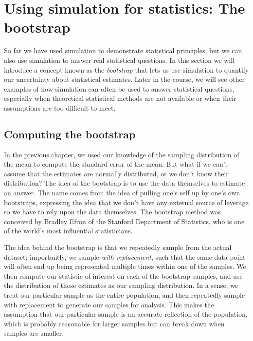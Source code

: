 \documentclass[12pt,]{book}
\theoremstyle{definition}
\theoremstyle{definition}
\theoremstyle{definition}
\theoremstyle{remark}
\begin{document}
\hypertarget{using-simulation-for-statistics-the-bootstrap}{%
\section{Using simulation for statistics: The bootstrap}\label{using-simulation-for-statistics-the-bootstrap}}

So far we have used simulation to demonstrate statistical principles, but we can also use simulation to answer real statistical questions. In this section we will introduce a concept known as the \emph{bootstrap} that lets us use simulation to quantify our uncertainty about statistical estimates. Later in the course, we will see other examples of how simulation can often be used to answer statistical questions, especially when theoretical statistical methods are not available or when their assumptions are too difficult to meet.

\hypertarget{computing-the-bootstrap}{%
\subsection{Computing the bootstrap}\label{computing-the-bootstrap}}

In the previous chapter, we used our knowledge of the sampling distribution of the mean to compute the standard error of the mean. But what if we can't assume that the estimates are normally distributed, or we don't know their distribution? The idea of the bootstrap is to use the data themselves to estimate an answer. The name comes from the idea of pulling one's self up by one's own bootstraps, expressing the idea that we don't have any external source of leverage so we have to rely upon the data themselves. The bootstrap method was conceived by Bradley Efron of the Stanford Department of Statistics, who is one of the world's most influential statisticians.

The idea behind the bootstrap is that we repeatedly sample from the actual dataset; importantly, we sample \emph{with replacement}, such that the same data point will often end up being represented multiple times within one of the samples. We then compute our statistic of interest on each of the bootstrap samples, and use the distribution of those estimates as our sampling distribution. In a sense, we treat our particular sample as the entire population, and then repeatedly sample with replacement to generate our samples for analysis. This makes the assumption that our particular sample is an accurate reflection of the population, which is probably reasonable for larger samples but can break down when samples are smaller.
\end{document}
